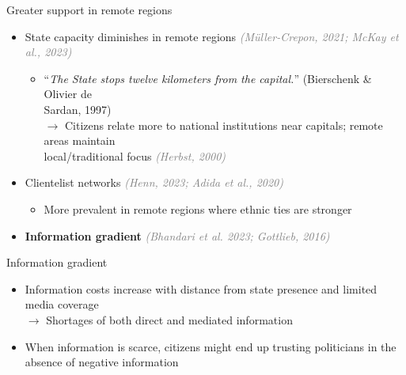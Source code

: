 \documentclass[aspectratio=169,xcolor=dvipsnames]{beamer}
\begin{document}
\begin{frame}{Greater support in remote regions}
\begin{itemize}
        \item State capacity diminishes in remote regions \textcolor{gray}{\textit{(Müller-Crepon, 2021; McKay et al., 2023)}}
        \vfill
    \begin{itemize}
        \item “\textit{The State stops twelve kilometers from the capital.}” (Bierschenk \& Olivier de \\
        \hspace{0.005em} Sardan, 1997)\\
        \vfill    
        $\rightarrow$ Citizens relate more to national institutions near capitals; remote areas maintain \\
        \hspace{1.1em} local/traditional focus \textcolor{gray}{\textit{(Herbst, 2000)}}\\
        \vfill
    \end{itemize}
\item Clientelist networks \textcolor{gray}{\textit{(Henn, 2023; Adida et al., 2020)}}
        \vfill
        \begin{itemize}
            \item More prevalent in remote regions where ethnic ties are stronger\\
            \vfill
        \end{itemize}
\item \textcolor[RGB]{220, 10, 10}{\textbf{Information gradient}} \textcolor{gray}{\textit{(Bhandari et al. 2023; Gottlieb, 2016)}}
\end{itemize}
\end{frame}

\begin{frame}{Information gradient}
\begin{itemize}
\item Information costs increase with distance from state presence and limited media coverage\\
\vfill
$\rightarrow$ Shortages of both direct and mediated information
\vfill
\item When information is scarce, citizens might end up trusting politicians in the absence of negative information
\end{itemize}
\end{frame}
\end{document}
